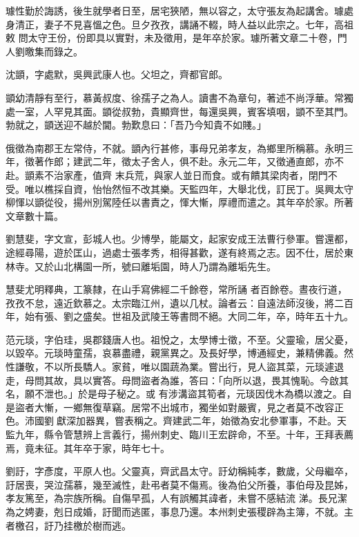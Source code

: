 \begin{pinyinscope}
 璩性勤於誨誘，後生就學者日至，居宅狹陋，無以容之，太守張友為起講舍。璩處身清正，妻子不見喜慍之色。旦夕孜孜，講誦不輟，時人益以此宗之。七年，高祖敕
 問太守王份，份即具以實對，未及徵用，是年卒於家。璩所著文章二十卷，門人劉曒集而錄之。



 沈顗，字處默，吳興武康人也。父坦之，齊都官郎。



 顗幼清靜有至行，慕黃叔度、徐孺子之為人。讀書不為章句，著述不尚浮華。常獨處一室，人罕見其面。顗從叔勃，貴顯齊世，每還吳興，賓客填咽，顗不至其門。勃就之，顗送迎不越於閫。勃歎息曰：「吾乃今知貴不如賤。」



 俄徵為南郡王左常侍，不就。顗內行甚修，事母兄弟孝友，為鄉里所稱慕。永明三年，徵著作郎；建武二年，徵太子舍人，俱不赴。永元二年，又徵通直郎，亦不赴。顗素不治家產，值齊
 末兵荒，與家人並日而食。或有饋其梁肉者，閉門不受。唯以樵採自資，怡怡然恒不改其樂。天監四年，大舉北伐，訂民丁。吳興太守柳惲以顗從役，揚州別駕陸任以書責之，惲大慚，厚禮而遣之。其年卒於家。所著文章數十篇。



 劉慧斐，字文宣，彭城人也。少博學，能屬文，起家安成王法曹行參軍。嘗還都，途經尋陽，遊於匡山，過處士張孝秀，相得甚歡，遂有終焉之志。因不仕，居於東林寺。又於山北構園一所，號曰離垢園，時人乃謂為離垢先生。



 慧斐尤明釋典，工篆隸，在山手寫佛經二千餘卷，常所誦
 者百餘卷。晝夜行道，孜孜不怠，遠近欽慕之。太宗臨江州，遺以几杖。論者云：自遠法師沒後，將二百年，始有張、劉之盛矣。世祖及武陵王等書問不絕。大同二年，卒，時年五十九。



 范元琰，字伯珪，吳郡錢唐人也。祖悅之，太學博士徵，不至。父靈瑜，居父憂，以毀卒。元琰時童孺，哀慕盡禮，親黨異之。及長好學，博通經史，兼精佛義。然性謙敬，不以所長驕人。家貧，唯以園蔬為業。嘗出行，見人盜其菜，元琰遽退走，母問其故，具以實答。母問盜者為誰，答曰：「向所以退，畏其愧恥。今啟其名，願不泄也。」於是母子秘之。或
 有涉溝盜其筍者，元琰因伐木為橋以渡之。自是盜者大慚，一鄉無復草竊。居常不出城市，獨坐如對嚴賓，見之者莫不改容正色。沛國劉獻深加器異，嘗表稱之。齊建武二年，始徵為安北參軍事，不赴。天監九年，縣令管慧辨上言義行，揚州刺史、臨川王宏辟命，不至。十年，王拜表薦焉，竟未征。其年卒于家，時年七十。



 劉訏，字彥度，平原人也。父靈真，齊武昌太守。訏幼稱純孝，數歲，父母繼卒，訏居喪，哭泣孺慕，幾至滅性，赴弔者莫不傷焉。後為伯父所養，事伯母及昆姊，孝友篤至，為宗族所稱。自傷早孤，人有誤觸其諱者，未嘗不感結流
 涕。長兄潔為之娉妻，剋日成婚，訏聞而逃匿，事息乃還。本州刺史張稷辟為主簿，不就。主者檄召，訏乃挂檄於樹而逃。




\end{pinyinscope}

